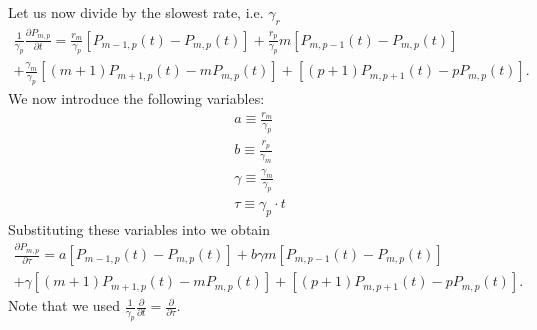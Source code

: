 
Let us now divide by the slowest rate, i.e. $\gamma_r$
\begin{equation}
\begin{aligned}
\frac{1}{\gamma_p} \frac{\partial P_{m,p}}{\partial t} =
\frac{r_m}{\gamma_p} \left[ P_{m-1,p}(t) - P_{m,p}(t) \right]
+ \frac{r_p}{\gamma_p} m  \left[ P_{m, p-1}(t) - P_{m, p}(t) \right]\\
+ \frac{\gamma_m}{\gamma_p} \left[ (m + 1) P_{m+1,p}(t) - m P_{m, p}(t) \right]
+ \left[ (p + 1) P_{m, p+1}(t) - p P_{m, p}(t) \right].
\end{aligned}
\label{eq_cme_over_gammap}
\end{equation}
We now introduce the following variables:
\begin{align}
  a \equiv \frac{r_m}{\gamma_p}\\
  b \equiv \frac{r_p}{\gamma_m}\\
  \gamma \equiv \frac{\gamma_m}{\gamma_p}\\
  \tau \equiv \gamma_p \cdot t
\end{align}
Substituting these variables into  we obtain
\begin{equation}
\begin{aligned}
\frac{\partial P_{m,p}}{\partial \tau} =
a \left[ P_{m-1,p}(t) - P_{m,p}(t) \right]
+ b \gamma m  \left[ P_{m, p-1}(t) - P_{m, p}(t) \right]\\
+ \gamma \left[ (m + 1) P_{m+1,p}(t) - m P_{m, p}(t) \right]
+ \left[ (p + 1) P_{m, p+1}(t) - p P_{m, p}(t) \right].
\end{aligned}
\label{eq_cme_tau}
\end{equation}
Note that we used $\frac{1}{\gamma_p}\frac{\partial}{\partial t} =
\frac{\partial}{\partial \tau}$.

